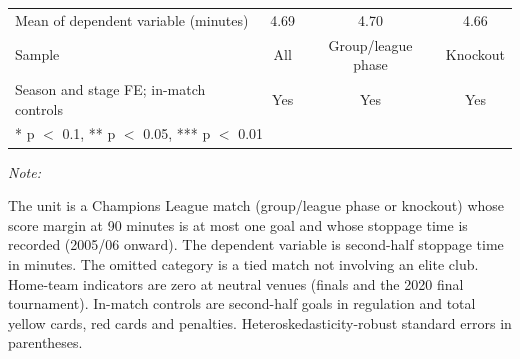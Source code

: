 \begin{table}[!h]
{\begin{threeparttable}
\begin{tabular}[t]{lccc}
Mean of dependent variable (minutes) & 4.69 & 4.70 & 4.66\\
Sample & All & Group/league phase & Knockout\\
Season and stage FE; in-match controls & Yes & Yes & Yes\\
\bottomrule
\multicolumn{4}{l}{\rule{0pt}{1em}* p $<$ 0.1, ** p $<$ 0.05, *** p $<$ 0.01}\\
\end{tabular}
\begin{tablenotes}[para]
\item \textit{Note: } 
\item The unit is a Champions League match (group/league phase or knockout) whose score margin at 90 minutes is at most one goal and whose stoppage time is recorded (2005/06 onward). The dependent variable is second-half stoppage time in minutes. The omitted category is a tied match not involving an elite club. Home-team indicators are zero at neutral venues (finals and the 2020 final tournament). In-match controls are second-half goals in regulation and total yellow cards, red cards and penalties. Heteroskedasticity-robust standard errors in parentheses.
\end{tablenotes}
\end{threeparttable}}
\end{table}
